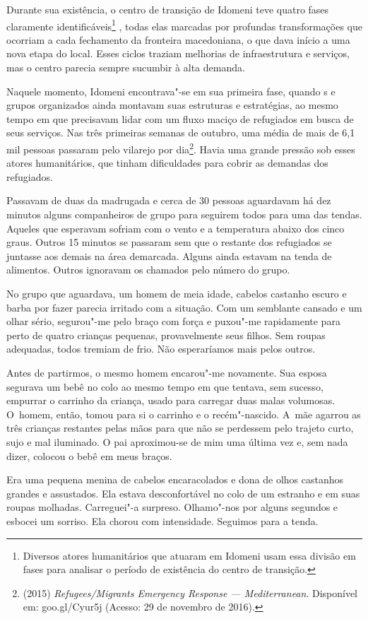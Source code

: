 Durante sua existência, o centro de transição de Idomeni teve quatro
fases claramente identificáveis\footnote{ Diversos atores humanitários que atuaram em Idomeni
usam essa divisão em fases para analisar o período de existência do
centro de transição.} , todas elas marcadas
por profundas transformações que ocorriam a cada fechamento da fronteira
macedoniana, o que dava início a uma nova etapa do local. Esses ciclos
traziam melhorias de infraestrutura e serviços, mas o centro parecia
sempre sucumbir à alta demanda.

Naquele momento, Idomeni encontrava"-se em sua primeira fase, quando s
e grupos organizados ainda montavam suas estruturas e estratégias, ao
mesmo tempo em que precisavam lidar com um fluxo maciço de refugiados em
busca de seus serviços. Nas três primeiras semanas de outubro, uma média
de mais de 6,1 mil pessoas passaram pelo vilarejo por
dia\footnote{  (2015) \emph{Refugees/Migrants Emergency
Response --- Mediterranean}. Disponível em:
goo.gl/Cyur5j (Acesso: 29 de
novembro de 2016).}. Havia uma grande pressão sob esses atores
humanitários, que tinham dificuldades para cobrir as demandas dos
refugiados.

Passavam de duas da madrugada e cerca de 30 pessoas aguardavam há dez
minutos alguns companheiros de grupo para seguirem todos para uma 
das tendas. Aqueles que esperavam sofriam com o vento e a
temperatura abaixo dos cinco graus. Outros 15 minutos se passaram sem
que o restante dos refugiados se juntasse aos demais na área demarcada.
Alguns ainda estavam na tenda de alimentos. Outros ignoravam os chamados
pelo número do grupo.

No grupo que aguardava, um homem de meia idade, cabelos castanho escuro
e barba por fazer parecia irritado com a situação. Com um semblante
cansado e um olhar sério, segurou"-me pelo braço com força e puxou"-me
rapidamente para perto de quatro crianças pequenas, provavelmente seus
filhos. Sem roupas adequadas, todos tremiam de frio. Não esperaríamos
mais pelos outros.

Antes de partirmos, o mesmo homem encarou"-me novamente. Sua esposa
segurava um bebê no colo ao mesmo tempo em que tentava, sem sucesso,
empurrar o carrinho da criança, usado para carregar duas malas volumosas.
 O~homem, então, tomou para si o carrinho e o recém"-nascido. A~mãe
agarrou as três crianças restantes pelas mãos para que não se perdessem
pelo trajeto curto, sujo e mal iluminado. O pai aproximou-se de mim uma última 
vez e, sem nada dizer, colocou o bebê em meus braços.

Era uma pequena menina de cabelos encaracolados e dona de olhos castanhos grandes e assustados.
 Ela estava desconfortável no colo de um estranho
e em suas roupas molhadas. Carreguei"-a surpreso. Olhamo"-nos por alguns
segundos e esbocei um sorriso. Ela chorou com intensidade. Seguimos para
a tenda.
